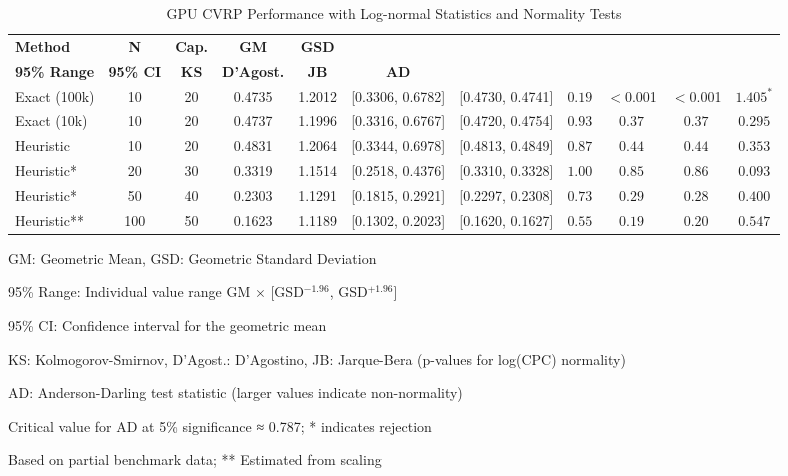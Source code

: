 \begin{table*}[htbp]
\centering
\caption{GPU CVRP Performance with Log-normal Statistics and Normality Tests}
\label{tab:gpu-performance-normality}
\begin{tabular}{@{}l c c S[table-format=1.4] S[table-format=1.4] c c c c c c@{}}
\toprule
\textbf{Method} & \textbf{N} & \textbf{Cap.} & {\textbf{GM}} & {\textbf{GSD}} & \\
\textbf{95\% Range} & \textbf{95\% CI} & \textbf{KS} & \textbf{D'Agost.} & \textbf{JB} & \textbf{AD} \\
\midrule
Exact (100k) & 10 & 20 & 0.4735 & 1.2012 & [0.3306, 0.6782] & [0.4730, 0.4741] & $0.19$ & $<$0.001 & $<$0.001 & $1.405^*$ \\
Exact (10k) & 10 & 20 & 0.4737 & 1.1996 & [0.3316, 0.6767] & [0.4720, 0.4754] & $0.93$ & $0.37$ & $0.37$ & $0.295$ \\
Heuristic & 10 & 20 & 0.4831 & 1.2064 & [0.3344, 0.6978] & [0.4813, 0.4849] & $0.87$ & $0.44$ & $0.44$ & $0.353$ \\
Heuristic* & 20 & 30 & 0.3319 & 1.1514 & [0.2518, 0.4376] & [0.3310, 0.3328] & $1.00$ & $0.85$ & $0.86$ & $0.093$ \\
Heuristic* & 50 & 40 & 0.2303 & 1.1291 & [0.1815, 0.2921] & [0.2297, 0.2308] & $0.73$ & $0.29$ & $0.28$ & $0.400$ \\
Heuristic** & 100 & 50 & 0.1623 & 1.1189 & [0.1302, 0.2023] & [0.1620, 0.1627] & $0.55$ & $0.19$ & $0.20$ & $0.547$ \\
\bottomrule
\end{tabular}
\begin{tablenotes}
\small
\item GM: Geometric Mean, GSD: Geometric Standard Deviation
\item 95\% Range: Individual value range GM $\times$ [GSD$^{-1.96}$, GSD$^{+1.96}$]
\item 95\% CI: Confidence interval for the geometric mean
\item KS: Kolmogorov-Smirnov, D'Agost.: D'Agostino, JB: Jarque-Bera (p-values for log(CPC) normality)
\item AD: Anderson-Darling test statistic (larger values indicate non-normality)
\item Critical value for AD at 5\% significance ≈ 0.787; * indicates rejection
\item * Based on partial benchmark data; ** Estimated from scaling
\end{tablenotes}
\end{table*}
